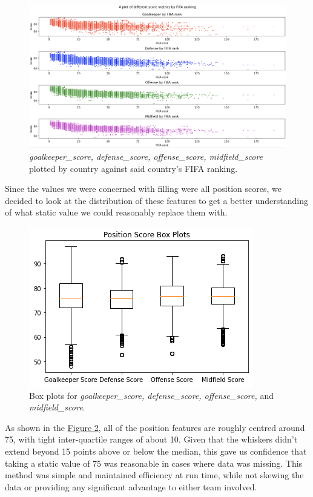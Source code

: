 \begin{figure}[H]
    \centering
    \includegraphics[scale=.3]{scores_plots.png}
    \caption{\textit{goalkeeper\_score, defense\_score, offense\_score, midfield\_score} plotted by country against said country's FIFA ranking.}
    \label{fig:scoreplots}
\end{figure}
Since the values we were concerned with filling were all position scores, we decided to look at the distribution of these features to get a better understanding of what static value we could reasonably replace them with.

\begin{figure}[H]
    \centering
    \includegraphics[scale=.6]{box_plots.png}
    \caption{Box plots for \textit{goalkeeper\_score, defense\_score, offense\_score,} and \textit{midfield\_score}.}
    \label{fig:boxplots}
\end{figure}
As shown in the \hyperref[fig:boxplots]{Figure 2}, all of the position features are roughly centred around 75, with tight inter-quartile ranges of about 10. Given that the whiskers didn't extend beyond 15 points above or below the median, this gave us confidence that taking a static value of 75 was reasonable in cases where data was missing. This method was simple and maintained efficiency at run time, while not skewing the data or providing any significant advantage to either team involved.

